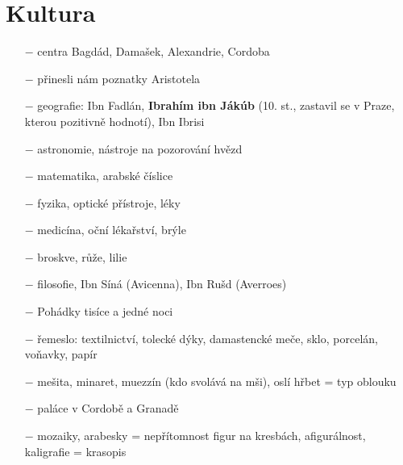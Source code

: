 \documentclass{article}
\begin{document}
\section*{Kultura}
\begin{itemize}
    \vspace{-0.5em}
    \setlength\itemsep{0.15em}
    \item[$-$] centra Bagdád, Damašek, Alexandrie, Cordoba
    \item[$-$] přinesli nám poznatky Aristotela
    \item[$-$] geografie: Ibn Fadlán, \textbf{Ibrahím ibn Jákúb} (10. st., zastavil se v Praze, kterou pozitivně hodnotí), Ibn Ibrisi
    \item[$-$] astronomie, nástroje na pozorování hvězd
    \item[$-$] matematika, arabské číslice
    \item[$-$] fyzika, optické přístroje, léky
    \item[$-$] medicína, oční lékařství, brýle
    \item[$-$] broskve, růže, lilie
    \item[$-$] filosofie, Ibn Síná (Avicenna), Ibn Rušd (Averroes)
    \item[$-$] Pohádky tisíce a jedné noci
    \item[$-$] řemeslo: textilnictví, tolecké dýky, damastencké meče, sklo, porcelán, voňavky, papír
    \item[$-$] mešita, minaret, muezzín (kdo svolává na mši), oslí hřbet = typ oblouku
    \item[$-$] paláce v Cordobě a Granadě
    \item[$-$] mozaiky, arabesky = nepřítomnost figur na kresbách, afigurálnost, kaligrafie = krasopis
\end{itemize}
\end{document}
